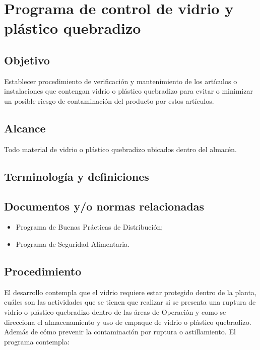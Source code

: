 \thispagestyle{formato-PI}
\renewcommand{\MayorVer}{2}
\renewcommand{\MenorVer}{0}
\renewcommand{\Titulo}{Programa de control de vidrio y plástico quebradizo}
\renewcommand{\TipoID}{PRO}
\renewcommand{\FechaPub}{2023--01}

\section{\Titulo}
\renewcommand{\Codigo}{\Prog--\thesection--\TipoID}

\subsection{Objetivo}
Establecer procedimiento de verificación y mantenimiento de los artículos o instalaciones que contengan vidrio o plástico quebradizo para evitar o minimizar un posible riesgo de contaminación del producto por estos artículos.

\subsection{Alcance}
Todo material de vidrio o plástico quebradizo ubicados dentro del almacén.

\subsection{Terminología y definiciones}
\begin{description}
\end{description}

\subsection{Documentos y/o normas relacionadas}
\begin{itemize}
	\item Programa de Buenas Prácticas de Distribución;
	\item Programa de Seguridad Alimentaria.
\end{itemize}

\subsection{Procedimiento}
El desarrollo contempla que el vidrio requiere estar protegido dentro de la planta, cuáles son las actividades que se tienen que realizar si se presenta una ruptura de vidrio o plástico quebradizo dentro de las áreas de Operación y como se direcciona el almacenamiento y uso de empaque de vidrio o plástico quebradizo. Además de cómo prevenir la contaminación por ruptura o astillamiento.
El programa contempla:

